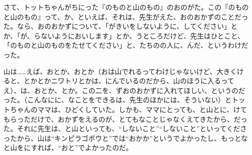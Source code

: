 さて、トットちゃんがちにった『のものと山のもの』のおのがた。この『のものと山のもの』って、か、といえば、それは、先生がえた、おのおかずのことだった。なら、おのおかずについて、「がきいをしないように、してください」とか、「が、らないようにおいします」とか、うところだけど、先生はひとこと、「のものと山のものをたせてください」と、たちのの人に、んだ、というわけだった。

山は……えば、おとか、おとか（おは山でれるってわけじゃないけど、大きくけると、とかとかニワトリとかは、にんでいるのだから、山のほうに入るってえ）、は、おとか、とか。この二を、ずおのおかずに入れてほしい、というのだった。（こんなにに、なことをできるは、先生のほかには、そういない）とトットちゃんのママは、ひどくしていた。しかも、ママにとっても、と山とに、けてもらっただけで、おかずをえるのが、とてもなことじゃなくえてきたから、だった。それに先生は、と山といっても、“しないこと”“しないこと”といってくださったから、山は“キンピラゴボウと”では“おかか”というでよかったし、もっとなと山をにすれば、“おと”でよかったのだ。

